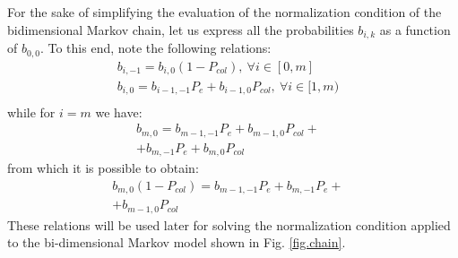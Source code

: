 \documentclass[10pt,onecolumn,a4paper]{IEEEtran}
\begin{document}
For the sake of simplifying the evaluation of the normalization
condition of the bidimensional Markov chain, let us express all
the probabilities $b_{i,k}$ as a function of $b_{0,0}$. To this
end, note the following relations:
\begin{equation}\label{trans_states_probabilities}
\begin{array}{ll}
b_{i,-1}=b_{i,0}\left(1-P_{col}\right),~\forall i\in
[0,m]&\\
b_{i,0}=b_{i-1,-1}P_e+b_{i-1,0}P_{col},~\forall i\in
[1,m)&\\
\end{array}
\end{equation}
while for $i=m$ we have:
\[
\begin{array}{ll}
b_{m,0}= b_{m-1,-1}P_e
+b_{m-1,0}P_{col}+&\\
+b_{m,-1}P_e+b_{m,0}P_{col}&
\end{array}
\]
from which it is possible to obtain:
\[
\begin{array}{ll}
b_{m,0}\left(1-P_{col}\right)= b_{m-1,-1}P_e
+b_{m,-1}P_e+&\\
+b_{m-1,0}P_{col}&
\end{array}
\]
These relations will be used later for solving the normalization
condition applied to the bi-dimensional Markov model shown in Fig.
\ref{fig.chain}.
\end{document}
